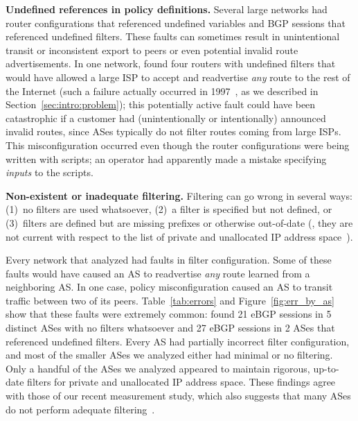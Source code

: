 {\bf Undefined references in policy definitions.} Several large networks
had router configurations that 
referenced undefined variables and BGP sessions that referenced
undefined filters.  
These faults can sometimes result in
unintentional transit or inconsistent export to peers or even potential
invalid route advertisements. 
In one network, \rcc found four routers with undefined filters that
would have allowed a large ISP to accept and readvertise {\em any} route to
the rest of the Internet (such a failure actually occurred in
1997~\cite{www-as7007}, as we described in Section~\ref{sec:intro:problem});
this potentially active fault could have been  
catastrophic if 
a customer had (unintentionally or intentionally) announced invalid routes,
since ASes typically do not filter routes coming from large ISPs.  This
misconfiguration occurred even though the router
configurations were being written with scripts; an operator had
apparently made a mistake specifying {\em inputs} to the scripts.


{\bf Non-existent or inadequate filtering.}  
Filtering can go wrong in several ways: (1)~no filters are used
whatsoever, (2)~a filter is specified but not defined, or
(3)~filters are defined but are missing prefixes or otherwise
out-of-date (\ie, they are not current 
with respect to the list of private and unallocated IP address
space~\cite{www-cymru-bogon}). 

Every network that \rcc analyzed had faults in filter configuration.
Some of these faults would have caused an AS to readvertise {\em any}
route learned from a neighboring AS.  In one case, policy
misconfiguration caused an AS to transit traffic between two of its
peers.  Table~\ref{tab:errors} and Figure~\ref{fig:err_by_as} show that
these faults were extremely common: \rcc found 21 eBGP sessions in 5
distinct ASes with no filters whatsoever and 27 eBGP sessions in 2 ASes
that referenced undefined filters.  Every AS had partially incorrect
filter configuration, and most of the smaller ASes we analyzed either
had minimal or no filtering.  Only a handful of the ASes we analyzed
appeared to maintain rigorous, up-to-date filters for private and
unallocated IP address space.  These findings agree with those of our
recent measurement study, which also suggests that many ASes do not
perform adequate filtering~\cite{Feamster2004f}.

